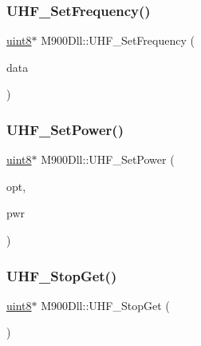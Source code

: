 \mbox{\label{class_m900_dll_a904f3f435c05f40bf102017dc4636cac}} 
\subsubsection{\texorpdfstring{UHF\_SetFrequency()}{UHF\_SetFrequency()}}
{\footnotesize\ttfamily \mbox{\hyperlink{m900dll_8h_adde6aaee8457bee49c2a92621fe22b79}{uint8}}$\ast$ M900\+Dll\+::\+U\+H\+F\+\_\+\+Set\+Frequency (\begin{DoxyParamCaption}\item[{\mbox{\hyperlink{struct_u_h_f___req_set_fre__t}{U\+H\+F\+\_\+\+Req\+Set\+Fre\+\_\+t}} $\ast$}]{data }\end{DoxyParamCaption})}

\mbox{\label{class_m900_dll_a97bd73d44f6826ddd641973ca46d960b}} 
\subsubsection{\texorpdfstring{UHF\_SetPower()}{UHF\_SetPower()}}
{\footnotesize\ttfamily \mbox{\hyperlink{m900dll_8h_adde6aaee8457bee49c2a92621fe22b79}{uint8}}$\ast$ M900\+Dll\+::\+U\+H\+F\+\_\+\+Set\+Power (\begin{DoxyParamCaption}\item[{\mbox{\hyperlink{m900dll_8h_adde6aaee8457bee49c2a92621fe22b79}{uint8}}}]{opt,  }\item[{\mbox{\hyperlink{m900dll_8h_adde6aaee8457bee49c2a92621fe22b79}{uint8}}}]{pwr }\end{DoxyParamCaption})}

\mbox{\label{class_m900_dll_af3cd29c6fc42f5ef07b59301b93b4eca}} 
\subsubsection{\texorpdfstring{UHF\_StopGet()}{UHF\_StopGet()}}
{\footnotesize\ttfamily \mbox{\hyperlink{m900dll_8h_adde6aaee8457bee49c2a92621fe22b79}{uint8}}$\ast$ M900\+Dll\+::\+U\+H\+F\+\_\+\+Stop\+Get (\begin{DoxyParamCaption}\item[{void}]{ }\end{DoxyParamCaption})}


